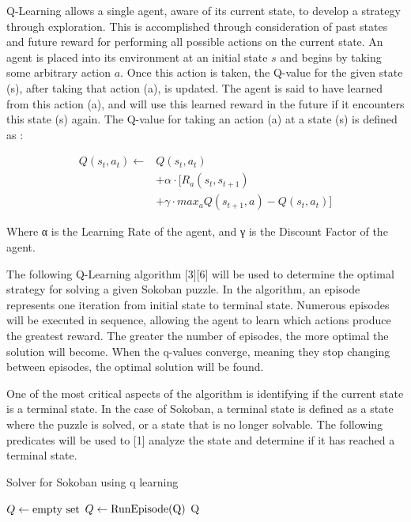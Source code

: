 \documentclass[times, 10pt,twocolumn]{article}
\begin{document}
Q-Learning allows a single agent, aware of its current state, to develop a strategy through exploration. This is accomplished through consideration of past states and future reward for performing all possible actions on the current state. An agent is placed into its environment at an initial state $s$ and begins by taking some arbitrary action $a$. Once this action is taken, the Q-value for the given state (s), after taking that action (a), is updated. The agent is said to have learned from this action (a), and will use this learned reward in the future if it encounters this state (s) again. The Q-value for taking an action (a) at a state (s) is defined as \cite{ex1}:

\begin{equation}
\begin{split}
Q(s_t, a_t) \gets &Q(s_t, a_t) \\
                  &+ \alpha \cdot [R_a(s_t, s_{t+1}) \\
                  &+ \gamma \cdot max_aQ(s_{t+1}, a) - Q(s_t, a_t)]
\end{split}
\end{equation}

Where α is the Learning Rate of the agent, and γ is the Discount Factor of the agent.



The following Q-Learning algorithm [3][6] will be used to determine the optimal strategy for solving a given Sokoban puzzle. In the algorithm, an episode represents one iteration from initial state to terminal state. Numerous episodes will be executed in sequence, allowing the agent to learn which actions produce the greatest reward. The greater the number of episodes, the more optimal the solution will become. When the q-values converge, meaning they stop changing between episodes, the optimal solution will be found.

One of the most critical aspects of the algorithm is identifying if the current state is a terminal state. In the case of Sokoban, a terminal state is defined as a state where the puzzle is solved, or a state that is no longer solvable. The following predicates will be used to [1] analyze the state and determine if it has reached a terminal state.

\begin{algorithm}
  \caption{Solver for Sokoban using q learning}
  \begin{algorithmic}[2]
      \State $Q\gets \textnormal{empty set}$
        \State $Q\gets \textnormal{RunEpisode(Q)}$
      \EndFor
      \Return Q
    \EndFunction
  \end{algorithmic}
\end{algorithm}
\end{document}
